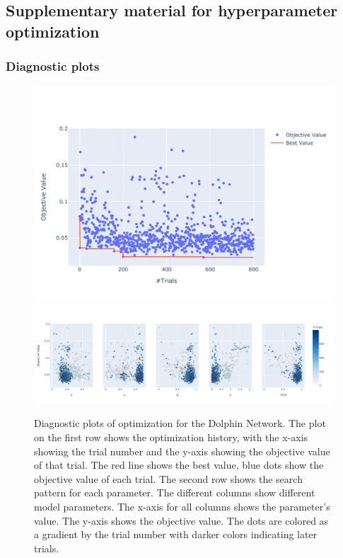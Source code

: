 \documentclass[11pt]{article}
\begin{document}
\subsection{Supplementary material for hyperparameter optimization}

\subsubsection{Diagnostic plots}
\begin{figure}[H]
    \centering
    \includegraphics[width=.7\linewidth]{../plots/overall/Optimization_History_dolphin.pdf}
    \includegraphics[width=.7\linewidth]{../plots/overall/Plot_Slice_dolphin.pdf}
  \caption{Diagnostic plots of optimization for the Dolphin Network. The plot on the first row shows the optimization history, with the x-axis showing the trial number and the y-axis showing the objective value of that trial. The red line shows the best value, blue dots show the objective value of each trial. The second row shows the search pattern for each parameter. The different columns show different model parameters. The x-axis for all columns shows the parameter's value. The y-axis shows the objective value. The dots are colored as a gradient by the trial number with darker colors indicating later trials.}
  \label{appendix:optimization_dolphin}
\end{figure}
\end{document}
